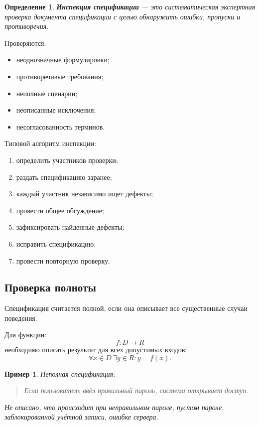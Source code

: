 \documentclass[12pt,a4paper]{article}
\newtheorem{definition}{Определение}
\newtheorem{example}{Пример}
\begin{document}
\begin{definition}
\textbf{Инспекция спецификации} --- это систематическая экспертная проверка документа спецификации с целью обнаружить ошибки, пропуски и противоречия.
\end{definition}

Проверяются:
\begin{itemize}
    \item неоднозначные формулировки;
    \item противоречивые требования;
    \item неполные сценарии;
    \item неописанные исключения;
    \item несогласованность терминов.
\end{itemize}

Типовой алгоритм инспекции:

\begin{enumerate}
    \item определить участников проверки;
    \item раздать спецификацию заранее;
    \item каждый участник независимо ищет дефекты;
    \item провести общее обсуждение;
    \item зафиксировать найденные дефекты;
    \item исправить спецификацию;
    \item провести повторную проверку.
\end{enumerate}

\subsection{Проверка полноты}

Спецификация считается полной, если она описывает все существенные случаи поведения.

Для функции:
\[
    f: D \to R
\]
необходимо описать результат для всех допустимых входов:
\[
    \forall x \in D \ \exists y \in R: y = f(x).
\]

\begin{example}
Неполная спецификация:
\begin{quote}
Если пользователь ввёл правильный пароль, система открывает доступ.
\end{quote}

Не описано, что происходит при неправильном пароле, пустом пароле, заблокированной учётной записи, ошибке сервера.
\end{example}
\end{document}
